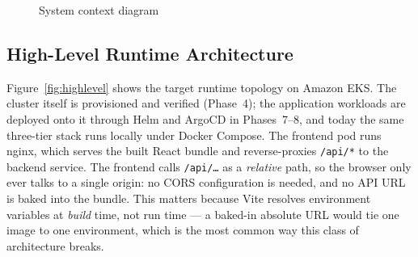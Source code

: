 \documentclass[11pt,a4paper]{article}
\begin{document}
\begin{figure}[H]
{}
\caption{System context diagram}
\label{fig:context}
\end{figure}

\subsection{High-Level Runtime Architecture}
Figure~\ref{fig:highlevel} shows the target runtime topology on Amazon EKS.
The cluster itself is provisioned and verified (Phase~4); the application
workloads are deployed onto it through Helm and ArgoCD in Phases~7--8, and
today the same three-tier stack runs locally under Docker Compose. The
frontend pod runs nginx, which serves the built React bundle and
reverse-proxies \texttt{/api/*} to the backend service. The frontend calls
\texttt{/api/\ldots} as a \emph{relative} path, so the browser only ever
talks to a single origin: no CORS configuration is needed, and no API URL is
baked into the bundle. This matters because Vite resolves environment
variables at \emph{build} time, not run time --- a baked-in absolute URL
would tie one image to one environment, which is the most common way this
class of architecture breaks.
\end{document}
